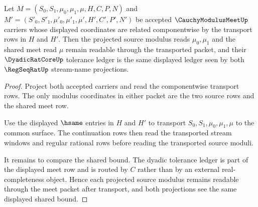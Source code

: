 \begin{theorem}\label{thm:cauchy-modulus-meet-projection-stability}
Let $M=(S_0,S_1,\mu_0,\mu_1,\mu,H,C,P,N)$ and $M'=(S'_0,S'_1,\mu'_0,\mu'_1,\mu',H',C',P',N')$ be accepted $\CauchyModulusMeetUp$ carriers whose displayed coordinates are related componentwise by the transport rows in $H$ and $H'$. Then the projected source modulus reads $\mu_0,\mu_1$ and the shared meet read $\mu$ remain readable through the transported packet, and their $\DyadicRatCoreUp$ tolerance ledger is the same displayed ledger seen by both $\RegSeqRatUp$ stream-name projections.
\end{theorem}
\begin{proof}
Project both accepted carriers and read the componentwise transport rows. The only modulus coordinates in either packet are the two source rows and the shared meet row.

Use the displayed $\hsame$ entries in $H$ and $H'$ to transport $S_0,S_1,\mu_0,\mu_1,\mu$ to the common surface. The continuation rows then read the transported stream windows and regular rational rows before reading the transported source moduli.

It remains to compare the shared bound. The dyadic tolerance ledger is part of the displayed meet row and is routed by $C$ rather than by an external real-completeness object. Hence each projected source modulus remains readable through the meet packet after transport, and both projections see the same displayed shared bound.
\end{proof}

